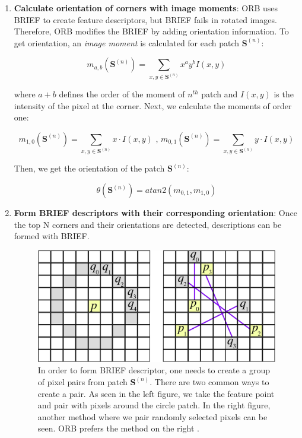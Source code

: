 \documentclass[12pt]{report}
\numberwithin{figure}{section}
\begin{document}
\begin{appendices}
\begin{enumerate}
	\item \textbf{Calculate orientation of corners with image moments}: ORB 
	uses BRIEF to create feature descriptors, but BRIEF fails in rotated 
	images. Therefore, ORB modifies the BRIEF by adding orientation 
	information. To get orientation, an \textit{image moment} is calculated 
	for each patch $\mathbf{S}^{(n)}$:
	
	\begin{equation}
	m_{a,b}(\mathbf{S}^{(n)}) = \sum_{x,y \in \mathbf{S}^{(n)}} x^a y^b I(x,y)
	\end{equation}
	
	where $a + b$ defines the order of the moment of $n^{th}$ patch and 
	$I(x,y)$ is the intensity of the pixel at the corner. Next, we calculate 
	the moments of order one: 
	
	\begin{equation}
	m_{1,0}(\mathbf{S}^{(n)}) = \sum_{x,y \in \mathbf{S}^{(n)}} x \cdot I(x,y) 
	\text{  ,  }
	m_{0,1}(\mathbf{S}^{(n)}) = \sum_{x,y \in \mathbf{S}^{(n)}} y \cdot I(x,y)
	\end{equation}
	
	Then, we get the orientation of the patch $\mathbf{S}^{(n)}$:
	
	\begin{equation}
	\theta(\mathbf{S}^{(n)}) = atan2(m_{0,1}, m_{1,0})
	\end{equation}
	
	\item \textbf{Form BRIEF descriptors with their corresponding 
		orientation}: Once the top N corners and their orientations are 
		detected, 
	descriptions can be formed with BRIEF. 
	
	\begin{figure}[H]
		\centering
		\includegraphics[width=0.6\linewidth,natwidth=640,natheight=640]
		{fig/ref_imgs/brief.png}
		\caption[BRIEF Descriptor]{In order to form BRIEF descriptor, one 
		needs 
			to create a group of pixel pairs from patch $\mathbf{S}^{(n)}$. 
			There are 
			two common ways to create a pair. As seen in the left figure, we 
			take the 
			feature point and pair with pixels around the circle patch. In the 
			right 
			figure, another method where we pair randomly selected pixels can 
			be 
			seen. ORB prefers the method on the right \parencite{Klette2014}.}
		\label{fig:brief}
	\end{figure}
	

\end{enumerate}
\end{appendices}
\end{document}
